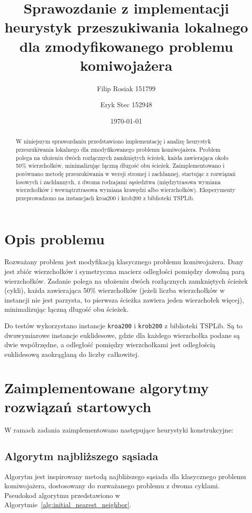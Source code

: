 \documentclass[12pt,a4paper]{article}
\title{Sprawozdanie z implementacji heurystyk przeszukiwania lokalnego dla zmodyfikowanego problemu komiwojażera}
\author{Filip Rosiak 151799  \and Eryk Stec 152948}
\date{\today}
\begin{document}
\maketitle

\begin{abstract}
W niniejszym sprawozdaniu przedstawiono implementację i analizę heurystyk przeszukiwania lokalnego dla zmodyfikowanego problemu komiwojażera. Problem polega na ułożeniu dwóch rozłącznych zamkniętych ścieżek, każda zawierająca około 50\% wierzchołków, minimalizując łączną długość obu ścieżek. Zaimplementowano i porównano metodę przeszukiwania w wersji stromej i zachłannej, startując z rozwiązań losowych i zachłannych, z dwoma rodzajami sąsiedztwa (międzytrasowa wymiana wierzchołków i wewnątrztrasowa wymiana krawędzi albo wierzchołków). Eksperymenty przeprowadzono na instancjach kroa200 i krob200 z biblioteki TSPLib.
\end{abstract}

\section{Opis problemu}
Rozważany problem jest modyfikacją klasycznego problemu komiwojażera. Dany jest zbiór wierzchołków i symetryczna macierz odległości pomiędzy dowolną parą wierzchołków. Zadanie polega na ułożeniu dwóch rozłącznych zamkniętych ścieżek (cykli), każda zawierająca 50\% wierzchołków (jeżeli liczba wierzchołków w instancji nie jest parzysta, to pierwsza ścieżka zawiera jeden wierzchołek więcej), minimalizując łączną długość obu ścieżek.

Do testów wykorzystano instancje \texttt{kroa200} i \texttt{krob200} z biblioteki TSPLib. Są to dwuwymiarowe instancje euklidesowe, gdzie dla każdego wierzchołka podane są dwie współrzędne, a odległość pomiędzy wierzchołkami jest odległością euklidesową zaokrąglaną do liczby całkowitej.

\section{Zaimplementowane algorytmy rozwiązań startowych}
W ramach zadania zaimplementowano następujące heurystyki konstrukcyjne:

\subsection{Algorytm najbliższego sąsiada}
Algorytm jest inspirowany metodą najbliższego sąsiada dla klasycznego problemu komiwojażera, dostosowany do rozważanego problemu z dwoma cyklami. Pseudokod algorytmu przedstawiono w Algorytmie~\ref{alg:initial_nearest_neighbor}.
\end{document}
